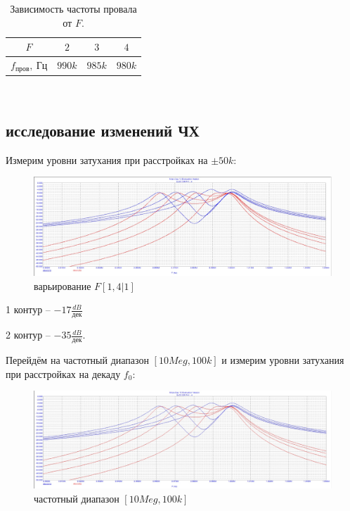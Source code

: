 \documentclass[a4paper, 14pt]{extarticle}%
\begin{document}
\begin{table}[h!]
	\label{t3}
	\begin{tabular}{|c|c|c|c|}
		\hline 
		$F$               & $2$    & $3$    & $4$    \\ \hline
		$f_{\text{пров}},~\text{Гц}$ & $990k$ & $985k$ & $980k$ \\ \hline
	\end{tabular}
		\caption{Зависимость частоты провала от $F$. }

\end{table}

~

\subsection{исследование изменений ЧХ}

Измерим уровни затухания при расстройках на $\pm 50k$:

\begin{figure}[h!]
	\centering
			\includegraphics[width=1.1\linewidth]{2.2_varF.jpg}
            \caption{варьирование $F  [1,4|1]$}
	\label{A}
\end{figure}

1 контур -- $-17 \frac{dB}{\text{дек}}$

2 контур -- $-35 \frac{dB}{\text{дек}}$.

Перейдём на частотный диапазон $[10Meg,100k]$ и измерим уровни затухания при расстройках на декаду $f_0$:

\begin{figure}[h!]
	\centering
			\includegraphics[width=1.1\linewidth]{2.2_freq_range.jpg}
            \caption{частотный диапазон $[10Meg, 100k]$}
	\label{A}
\end{figure}
\end{document}
